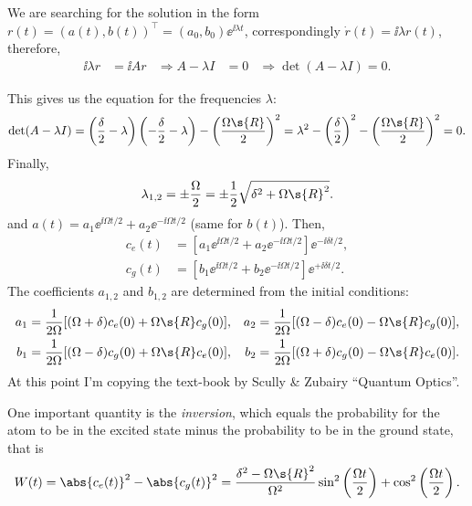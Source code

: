 \documentclass[fontsize=9pt,twoside=semi,bookmarkpackage=false]{scrartcl}
\begin{document}
We are searching for the solution in the form $r(t) = (a(t), b(t))^\intercal = (a_0 , b_0) \ee^{ \ii \lambda t }$, correspondingly $\dot r(t) = \ii \lambda r(t)$, therefore,
\begin{align}
  \ii \lambda r & = \ii A r
  &
  \Longrightarrow
  A - \lambda I & = 0
  &
  \Longrightarrow
  \det( A - \lambda I ) = 0.
\end{align}

This gives us the equation for the frequencies $\lambda$:
\begin{equation}
  \det( A - \lambda I )
  =
  \left( \frac{ \delta }{ 2 } - \lambda \right)\left( - \frac{ \delta }{ 2 } - \lambda \right)
  - \left( \frac{ \Omega\s{R} }{ 2 }  \right)^2
  = \lambda^2 - \left( \frac{ \delta }{ 2 } \right)^2 - \left( \frac{ \Omega\s{R} }{ 2 } \right)^2 = 0.
\end{equation}
Finally,
\begin{equation}
  \lambda_{1,2 } = \pm \frac \Omega 2 = \pm \frac 12 \sqrt{ \delta^2 + \Omega\s{R}^2 }.
\end{equation}
and $a(t) = a_1 \ee^{ \ii \Omega t / 2 } + a_2 \ee^{ - \ii \Omega t / 2}$ (same for $b(t)$).
Then,
\begin{align}
  c_e (t) & = [
  a_1 \ee^{ \ii \Omega t / 2 }
  +
  a_2 \ee^{ - \ii \Omega t / 2 }
  ] \ee^{ - \ii \delta t / 2 },
  \\
  c_g (t) & = [
  b_1 \ee^{ \ii \Omega t / 2 }
  +
  b_2 \ee^{ - \ii \Omega t / 2 }
  ] \ee^{ + \ii \delta t / 2 }.
\end{align}
The coefficients $a_{1,2}$ and $b_{1,2}$ are determined from the initial conditions:
\begin{align}
  a_1 & = \frac{ 1 }{ 2 \Omega } [ ( \Omega + \delta ) c_e (0) + \Omega\s{R} c_g (0) ], &
  a_2 & = \frac{ 1 }{ 2 \Omega } [ ( \Omega - \delta ) c_e (0) - \Omega\s{R} c_g (0) ],
  \\
  b_1 & = \frac{ 1 }{ 2 \Omega } [ ( \Omega - \delta ) c_g (0) + \Omega\s{R} c_e (0) ], &
  b_2 & = \frac{ 1 }{ 2 \Omega } [ ( \Omega + \delta ) c_g (0) - \Omega\s{R} c_e (0) ].
\end{align}
At this point I'm copying the text-book by Scully \& Zubairy ``Quantum Optics''.

One important quantity is the \emph{inversion}, which equals the probability for the atom to be in the excited state minus the probability to be in the ground state, that is
\begin{equation}
  W(t) = \abs{ c_e (t) }^2 - \abs{ c_g (t) }^2 =
  \frac{ \delta^2 - \Omega\s{R}^2 }{ \Omega^2 } 
  \sin^2 \left( \frac{ \Omega t }{ 2 } \right) +
  \cos^2 \left( \frac{ \Omega t }{ 2 } \right).
\end{equation}
\end{document}
